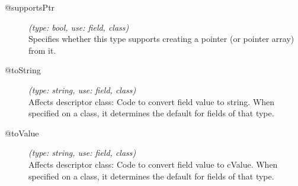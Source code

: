 \begin{description}
\item[@supportsPtr] \textit{(type: bool, use: field, class)} \\
  Specifies whether this type supports creating a pointer (or pointer array)
  from it.

\item[@toString] \textit{(type: string, use: field, class)} \\
  Affects descriptor class: Code to convert field value to string. When
  specified on a class, it determines the default for fields of that type.

\item[@toValue] \textit{(type: string, use: field, class)} \\
  Affects descriptor class: Code to convert field value to cValue. When
  specified on a class, it determines the default for fields of that type.

\end{description}


